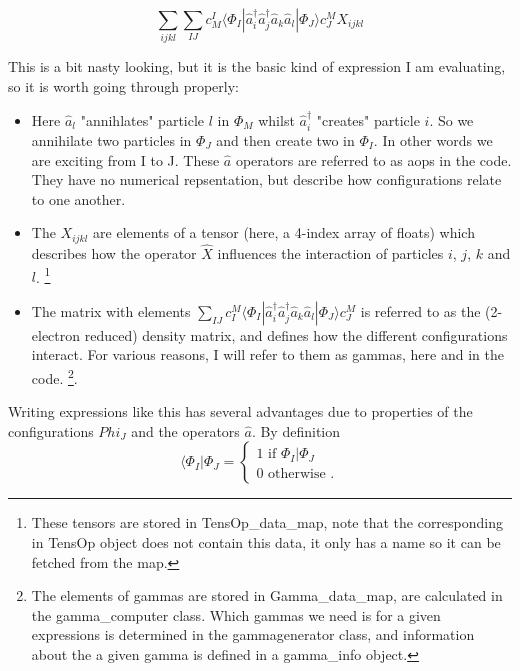 \documentclass[12pt]{article}
\begin{document}
\begin{equation}
\sum_{ijkl}\sum_{IJ} c_{M}^{I}\langle \Phi_{I} | \hat{a}_{i}^{\dagger}\hat{a}_{j}^{\dagger}\hat{a}_{k}\hat{a}_{l} | \Phi_{J} \rangle c_{J}^{M} X_{ijkl}
\label{eqn:2el_expectation}
\end{equation}

This is a bit nasty looking, but it is the basic kind of expression I am evaluating, so it is worth going through properly:
\begin{itemize}
\item Here $\hat{a}_{l}$ "annihlates" particle $l$ in $\Phi_{M}$ whilst
$\hat{a}^{\dagger}_{i}$ "creates" particle $i$. So we annihilate two particles in $\Phi_{J}$
and then create two in $\Phi_{I}$. In other words we are exciting from I to J.
These $\hat{a}$ operators are referred to as aops in the code. They have no numerical repsentation,
but describe how configurations relate to one another.
\item The $X_{ijkl}$ are elements of a tensor (here, a 4-index array of floats) which describes how
the operator $\hat{X}$ influences the interaction of particles $i$, $j$, $k$ and $l$.
\footnote{These tensors are stored in TensOp\_data\_map, note that the corresponding in TensOp object
does not contain this data, it only has a name so it can be fetched from the map. }  \\
\item The matrix with elements
$\sum_{IJ} c^{M}_{I}\langle \Phi_{I} | \hat{a}_{i}^{\dagger}\hat{a}_{j}^{\dagger}\hat{a}_{k}\hat{a}_{l} | \Phi_{J} \rangle c_{J}^{M}  $
is referred to as the (2-electron reduced) density matrix, and defines how the different configurations interact. For various reasons,
I will refer to them as gammas, here and in the code. \footnote{The elements of gammas are stored in Gamma\_data\_map, are
calculated in the gamma\_computer class. Which gammas we need is for a given expressions is
determined in the gammagenerator class, and information about the a given gamma is defined in a gamma\_info object.}.\\
\end{itemize}
Writing expressions like this has several advantages due to properties of the configurations
 $Phi_{J}$ and the operators $\hat{a}$. By definition
\begin{equation}
\langle \Phi_{I} | \Phi_{J} = 
\begin{cases}
1 \text{\  \ \ \  \ \ \ \ if } \Phi_{I} | \Phi_{J}\\ 
0 \text{ \ \ otherwise }.
\end{cases}
\label{eqn:overlap}
\end{equation}
\end{document}
